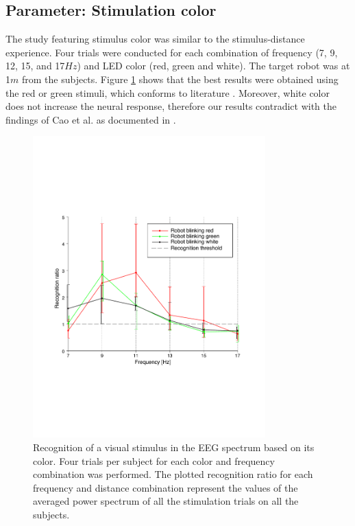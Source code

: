 \documentclass[smallextended]{svjour3}
\begin{document}
\subsection{Parameter: Stimulation color}
The study featuring stimulus color was similar to the stimulus-distance experience. Four trials were conducted for each combination of frequency (7, 9, 12, 15, and 17$Hz$) and LED color (red, green and white). The target robot was at 1$m$ from the subjects. Figure \ref{fig:graph-couleurs} shows that the best results were obtained using the red or green stimuli, which conforms to literature \cite{chua2004effects,duvinage2013performance,paper_5,hvaring2014comparison}. Moreover, white color does not increase the neural response, therefore our results contradict with the findings of Cao et al. as documented in \cite{cao2012flashing}. 

\begin{figure}
\center
\includegraphics[width=0.8\textwidth]{figures/graph-couleurs.pdf}
\caption{Recognition of a visual stimulus in the EEG spectrum based on its color. Four trials per subject for each color and frequency combination was performed. The plotted recognition ratio for each frequency and distance combination represent the values of the averaged power spectrum of all the stimulation trials on all the subjects.} \label{fig:graph-couleurs}
\end{figure}
\end{document}
